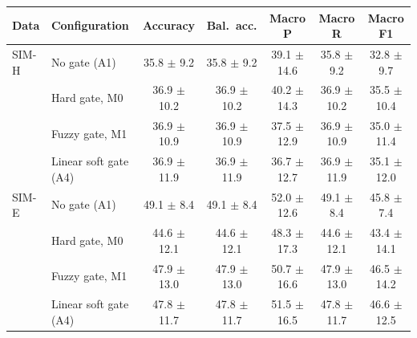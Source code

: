 \begin{tabular}{@{}llccccc@{}}
\toprule
Data & Configuration & Accuracy & Bal.\ acc. & Macro P & Macro R & Macro F1\\
\midrule
SIM-H & No gate (A1) & 35.8 $\pm$ 9.2 & 35.8 $\pm$ 9.2 & 39.1 $\pm$ 14.6 & 35.8 $\pm$ 9.2 & 32.8 $\pm$ 9.7\\
 & Hard gate, M0 & 36.9 $\pm$ 10.2 & 36.9 $\pm$ 10.2 & 40.2 $\pm$ 14.3 & 36.9 $\pm$ 10.2 & 35.5 $\pm$ 10.4\\
 & Fuzzy gate, M1 & 36.9 $\pm$ 10.9 & 36.9 $\pm$ 10.9 & 37.5 $\pm$ 12.9 & 36.9 $\pm$ 10.9 & 35.0 $\pm$ 11.4\\
 & Linear soft gate (A4) & 36.9 $\pm$ 11.9 & 36.9 $\pm$ 11.9 & 36.7 $\pm$ 12.7 & 36.9 $\pm$ 11.9 & 35.1 $\pm$ 12.0\\
\midrule
SIM-E & No gate (A1) & 49.1 $\pm$ 8.4 & 49.1 $\pm$ 8.4 & 52.0 $\pm$ 12.6 & 49.1 $\pm$ 8.4 & 45.8 $\pm$ 7.4\\
 & Hard gate, M0 & 44.6 $\pm$ 12.1 & 44.6 $\pm$ 12.1 & 48.3 $\pm$ 17.3 & 44.6 $\pm$ 12.1 & 43.4 $\pm$ 14.1\\
 & Fuzzy gate, M1 & 47.9 $\pm$ 13.0 & 47.9 $\pm$ 13.0 & 50.7 $\pm$ 16.6 & 47.9 $\pm$ 13.0 & 46.5 $\pm$ 14.2\\
 & Linear soft gate (A4) & 47.8 $\pm$ 11.7 & 47.8 $\pm$ 11.7 & 51.5 $\pm$ 16.5 & 47.8 $\pm$ 11.7 & 46.6 $\pm$ 12.5\\
\bottomrule
\end{tabular}
